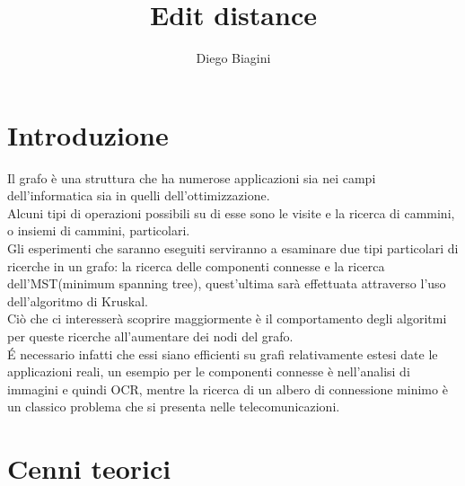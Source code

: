 \documentclass[]{article}
\author{Diego Biagini}
\title{Edit distance}
\begin{document}
\maketitle
\newpage
\section{Introduzione}
Il grafo è una struttura che ha numerose applicazioni sia nei campi dell'informatica sia in quelli dell'ottimizzazione.\\
Alcuni tipi di operazioni possibili su di esse sono le visite e la ricerca di cammini, o insiemi di cammini, particolari.\\
Gli esperimenti che saranno eseguiti serviranno a esaminare due tipi particolari di ricerche in un grafo: la ricerca delle componenti connesse e la ricerca dell'MST(minimum spanning tree), quest'ultima sarà effettuata attraverso l'uso dell'algoritmo di Kruskal.\\
Ciò che ci interesserà scoprire maggiormente è il comportamento degli algoritmi per queste ricerche all'aumentare dei nodi del grafo.\\
\'E necessario infatti che essi siano efficienti su grafi relativamente estesi date le applicazioni reali, un esempio per le componenti connesse è nell'analisi di immagini e quindi OCR, mentre la ricerca di un albero di connessione minimo è un classico problema che si presenta nelle telecomunicazioni.\\ 
\section{Cenni teorici}
\end{document}
